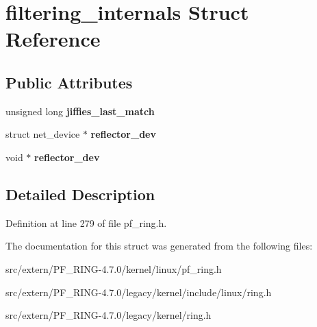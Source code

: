\hypertarget{structfiltering__internals}{
\section{filtering\_\-internals Struct Reference}
\label{structfiltering__internals}
}
\subsection*{Public Attributes}
\begin{DoxyCompactItemize}
\item 
\hypertarget{structfiltering__internals_ae8c91911e9f4097a5d43da2e8badbaf0}{
unsigned long {\bfseries jiffies\_\-last\_\-match}}
\label{structfiltering__internals_ae8c91911e9f4097a5d43da2e8badbaf0}

\item 
\hypertarget{structfiltering__internals_a378cfb98d1f3dc4b8f549ed841300b5a}{
struct net\_\-device $\ast$ {\bfseries reflector\_\-dev}}
\label{structfiltering__internals_a378cfb98d1f3dc4b8f549ed841300b5a}

\item 
\hypertarget{structfiltering__internals_a919a71f649965d940ff9eb441f1520db}{
void $\ast$ {\bfseries reflector\_\-dev}}
\label{structfiltering__internals_a919a71f649965d940ff9eb441f1520db}

\end{DoxyCompactItemize}


\subsection{Detailed Description}


Definition at line 279 of file pf\_\-ring.h.



The documentation for this struct was generated from the following files:\begin{DoxyCompactItemize}
\item 
src/extern/PF\_\-RING-\/4.7.0/kernel/linux/pf\_\-ring.h\item 
src/extern/PF\_\-RING-\/4.7.0/legacy/kernel/include/linux/ring.h\item 
src/extern/PF\_\-RING-\/4.7.0/legacy/kernel/ring.h\end{DoxyCompactItemize}
